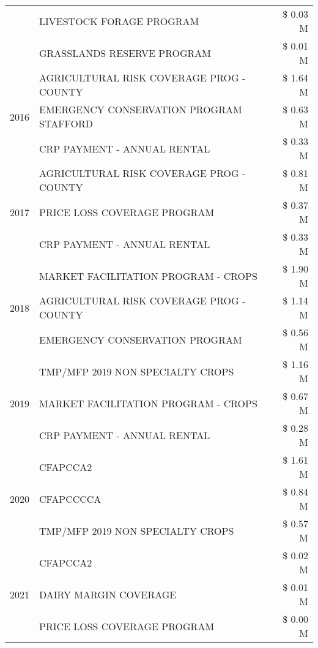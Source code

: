 \begin{tabular}{llr}
 & LIVESTOCK FORAGE PROGRAM & \$ 0.03 M \\
 & GRASSLANDS RESERVE PROGRAM & \$ 0.01 M \\
\cline{1-3}
\multirow[t]{3}{*}{2016} & AGRICULTURAL RISK COVERAGE PROG - COUNTY & \$ 1.64 M \\
 & EMERGENCY CONSERVATION PROGRAM STAFFORD & \$ 0.63 M \\
 & CRP PAYMENT - ANNUAL RENTAL & \$ 0.33 M \\
\cline{1-3}
\multirow[t]{3}{*}{2017} & AGRICULTURAL RISK COVERAGE PROG - COUNTY & \$ 0.81 M \\
 & PRICE LOSS COVERAGE PROGRAM & \$ 0.37 M \\
 & CRP PAYMENT - ANNUAL RENTAL & \$ 0.33 M \\
\cline{1-3}
\multirow[t]{3}{*}{2018} & MARKET FACILITATION PROGRAM - CROPS & \$ 1.90 M \\
 & AGRICULTURAL RISK COVERAGE PROG - COUNTY & \$ 1.14 M \\
 & EMERGENCY CONSERVATION PROGRAM & \$ 0.56 M \\
\cline{1-3}
\multirow[t]{3}{*}{2019} & TMP/MFP 2019 NON SPECIALTY CROPS & \$ 1.16 M \\
 & MARKET FACILITATION PROGRAM - CROPS & \$ 0.67 M \\
 & CRP PAYMENT - ANNUAL RENTAL & \$ 0.28 M \\
\cline{1-3}
\multirow[t]{3}{*}{2020} & CFAPCCA2 & \$ 1.61 M \\
 & CFAPCCCCA & \$ 0.84 M \\
 & TMP/MFP 2019 NON SPECIALTY CROPS & \$ 0.57 M \\
\cline{1-3}
\multirow[t]{3}{*}{2021} & CFAPCCA2 & \$ 0.02 M \\
 & DAIRY MARGIN COVERAGE & \$ 0.01 M \\
 & PRICE LOSS COVERAGE PROGRAM & \$ 0.00 M \\
\cline{1-3}
\bottomrule
\end{tabular}
